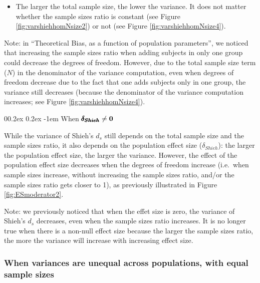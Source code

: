 \documentclass[
  english,
  man]{apa6}
\makeatletter
\providecommand{\tightlist}{%
  \setlength{\itemsep}{0pt}\setlength{\parskip}{0pt}}
\let\oldparagraph\paragraph
\renewcommand{\paragraph}[1]{\oldparagraph{#1}\mbox{}}
\renewcommand{\paragraph}{\@startsection{paragraph}{4}{\parindent}%
  {0\baselineskip \@plus 0.2ex \@minus 0.2ex}%
  {-1em}%
  {\normalfont\normalsize\bfseries\itshape\typesectitle}}
\makeatother
\begin{document}
\begin{itemize}
\tightlist
\item
  The larger the total sample size, the lower the variance. It does not matter whether the sample sizes ratio is constant (see Figure \ref{fig:varshiehhomNsize2}) or not (see Figure \ref{fig:varshiehhomNsize4}).
\end{itemize}

Note: in \enquote{Theoretical Bias, as a function of population parameters}, we noticed that increasing the sample sizes ratio when adding subjects in only one group could decrease the degrees of freedom. However, due to the total sample size term (\(N\)) in the denominator of the variance computation, even when degrees of freedom decrease due to the fact that one adds subjects only in one group, the variance still decreases (because the denominator of the variance computation increases; see Figure \ref{fig:varshiehhomNsize4}).

\hypertarget{when-bf-pmbdelta_shieh-neq-0}{%
\paragraph{\texorpdfstring{When \(\bf \pmb{\delta_{Shieh}} \neq 0\)}{When \textbackslash bf \textbackslash pmb\{\textbackslash delta\_\{Shieh\}\} \textbackslash neq 0}}\label{when-bf-pmbdelta_shieh-neq-0}}

While the variance of Shieh's \(d_s\) still depends on the total sample size and the sample sizes ratio, it also depends on the population effect size (\(\delta_{Shieh}\)): the larger the population effect size, the larger the variance. However, the effect of the population effect size decreases when the degrees of freedom increase (i.e.~when sample sizes increase, without increasing the sample sizes ratio, and/or the sample sizes ratio gets closer to 1), as previously illustrated in Figure \ref{fig:ESmoderator2}.

Note: we previously noticed that when the effet size is zero, the variance of Shieh's \(d_s\) decreases, even when the sample sizes ratio increases. It is no longer true when there is a non-null effect size because the larger the sample sizes ratio, the more the variance will increase with increasing effect size.

\hypertarget{when-variances-are-unequal-across-populations-with-equal-sample-sizes-2}{%
\subsubsection{When variances are unequal across populations, with equal sample sizes}\label{when-variances-are-unequal-across-populations-with-equal-sample-sizes-2}}
\end{document}

